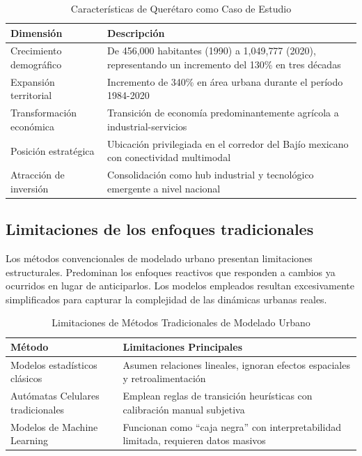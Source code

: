 \begin{table}[htbp]
\centering
\caption{Características de Querétaro como Caso de Estudio}
\label{tab:queretaro_facts}
\begin{tabular}{lp{9cm}}
\toprule
\textbf{Dimensión} & \textbf{Descripción} \\
\midrule
Crecimiento demográfico & De 456{,}000 habitantes (1990) a 1{,}049{,}777 (2020), representando un incremento del 130\% en tres décadas \\
Expansión territorial & Incremento de 340\% en área urbana durante el período 1984-2020 \\
Transformación económica & Transición de economía predominantemente agrícola a industrial-servicios \\
Posición estratégica & Ubicación privilegiada en el corredor del Bajío mexicano con conectividad multimodal \\
Atracción de inversión & Consolidación como hub industrial y tecnológico emergente a nivel nacional \\
\bottomrule
\end{tabular}
\end{table}

\subsection{Limitaciones de los enfoques tradicionales}

Los métodos convencionales de modelado urbano presentan limitaciones estructurales. Predominan los enfoques reactivos que responden a cambios ya ocurridos en lugar de anticiparlos. Los modelos empleados resultan excesivamente simplificados para capturar la complejidad de las dinámicas urbanas reales.

\begin{table}[htbp]
\centering
\caption{Limitaciones de Métodos Tradicionales de Modelado Urbano}
\label{tab:method_limitations}
\begin{tabular}{lp{10cm}}
\toprule
\textbf{Método} & \textbf{Limitaciones Principales} \\
\midrule
Modelos estadísticos clásicos & Asumen relaciones lineales, ignoran efectos espaciales y retroalimentación \\
Autómatas Celulares tradicionales & Emplean reglas de transición heurísticas con calibración manual subjetiva \\
Modelos de Machine Learning & Funcionan como ``caja negra'' con interpretabilidad limitada, requieren datos masivos \\
\bottomrule
\end{tabular}
\end{table}

